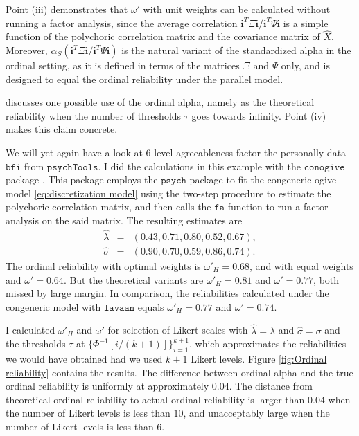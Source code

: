 \documentclass[twoside]{article}
\begin{document}
Point (iii) demonstrates that $\omega'$ with unit weights can be
calculated without running a factor analysis, since the average correlation
$\mathbf{i}^{T}\Xi\mathbf{i}/\mathbf{i}^{T}\Psi\mathbf{i}$ is a simple
function of the polychoric correlation matrix and the covariance matrix
of $\hat{X}.$ Moreover, $\alpha_S(\mathbf{i}^{T}\Xi\mathbf{i}/\mathbf{i}^{T}\Psi\mathbf{i})$
is the natural variant of the standardized alpha in the ordinal setting,
as it is defined in terms of the matrices $\Xi$ and $\Psi$ only,
and is designed to equal the ordinal reliability under the parallel
model. 

\citet[p. 1068]{Chalmers2018-fj} discusses one possible use of the
ordinal alpha, namely as the theoretical reliability when the number
of thresholds $\tau$ goes towards infinity. Point (iv) makes this
claim concrete.

\begin{example}
We will yet again have a look at $6$-level agreeableness factor the
personally data $\mathtt{bfi}$ from $\mathtt{psychTools}$. I did the calculations in this example with the $\mathtt{conogive}$ package \citep{conogive}. This package employs the $\mathtt{psych}$ \citep{psych} package to fit the congeneric ogive
model \eqref{eq:discretization model} using the two-step procedure
to estimate the polychoric correlation matrix, and then calls the $\mathtt{fa}$ function to run a factor analysis on the said matrix.
The resulting estimates are 
\begin{eqnarray*}
\hat{\lambda} & = & (0.43,0.71,0.80,0.52,0.67),\\
\hat{\sigma} & = & (0.90,0.70,0.59,0.86,0.74).
\end{eqnarray*} The ordinal reliability
with optimal weights is $\omega'_{H}=0.68$, and with equal weights
and $\omega'=0.64$. But the theoretical variants are $\omega'_{H}=0.81$
and $\omega'=0.77$, both missed by large margin. In comparison, the
reliabilities calculated under the congeneric model with $\mathtt{lavaan}$ \citep{Rosseel2012-yg}
equals $\omega'_{H}=0.77$ and $\omega'=0.74$.

I calculated $\omega'_{H}$ and $\omega'$ for selection of Likert
scales with $\hat{\lambda} = \lambda$ and $\hat{\sigma}=\sigma$ and
the thresholds $\tau$ at $\{\Phi^{-1}[i/(k+1)]\}_{i=1}^{k+1}$, which
approximates the reliabilities we would have obtained had we used
$k+1$ Likert levels. Figure \ref{fig:Ordinal reliability} contains the results. The difference between ordinal alpha and the true ordinal reliability is uniformly at approximately $0.04$. The distance from theoretical ordinal reliability to actual ordinal reliability is larger than $0.04$ when the number of Likert levels is less than $10$, and unacceptably large when the number of Likert levels is less than $6$. 
\end{example}
\end{document}
